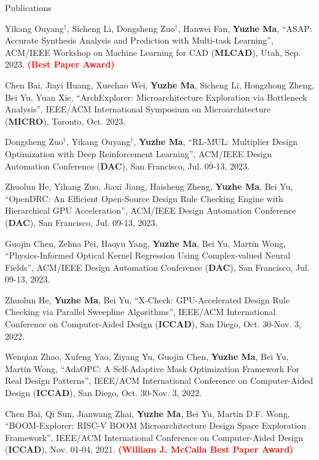 \begin{rSection}{Publications}
\begin{etaremune}
\item {
	Yikang Ouyang$^\dagger$, Sicheng Li, Dongsheng Zuo$^\dagger$, Hanwei Fan, \textbf{Yuzhe Ma},
	``ASAP: Accurate Synthesis Analysis and Prediction with Multi-task Learning'',
	ACM/IEEE Workshop on Machine Learning for CAD (\textbf{MLCAD}), Utah, Sep. 2023.
	\textcolor{red}{\textbf{(Best Paper Award)}}
}

\item {
    Chen Bai, Jiayi Huang, Xuechao Wei, \textbf{Yuzhe Ma}, Sicheng Li, Hongzhong Zheng, Bei Yu, Yuan Xie,
    ``ArchExplorer: Microarchitecture Exploration via Bottleneck Analysis'', 
    IEEE/ACM International Symposium on Microarchitecture (\textbf{MICRO}), Toronto, Oct. 2023.
}

\item {
    Dongsheng Zuo$^\dagger$, Yikang Ouyang$^\dagger$, \textbf{Yuzhe Ma},
    ``RL-MUL: Multiplier Design Optimization with Deep Reinforcement Learning'',
    ACM/IEEE Design Automation Conference (\textbf{DAC}), San Francisco, Jul. 09-13, 2023.
}

\item {
    Zhuolun He, Yihang Zuo, Jiaxi Jiang, Haisheng Zheng, \textbf{Yuzhe Ma}, Bei Yu,
    ``OpenDRC: An Efficient Open-Source Design Rule Checking Engine with Hierarchical GPU Acceleration'',
    ACM/IEEE Design Automation Conference (\textbf{DAC}), San Francisco, Jul. 09-13, 2023.
}

\item {
    Guojin Chen, Zehua Pei, Haoyu Yang, \textbf{Yuzhe Ma}, Bei Yu, Martin Wong,
    ``Physics-Informed Optical Kernel Regression Using Complex-valued Neural Fields'',
    ACM/IEEE Design Automation Conference (\textbf{DAC}), San Francisco, Jul. 09-13, 2023.
}

\item {
    Zhuolun He, \textbf{Yuzhe Ma}, Bei Yu,
    ``X-Check: GPU-Accelerated Design Rule Checking via Parallel Sweepline Algorithms'',
    IEEE/ACM International Conference on Computer-Aided Design (\textbf{ICCAD}), San Diego, Oct. 30-Nov. 3, 2022.
}

\item {
    Wenqian Zhao, Xufeng Yao, Ziyang Yu, Guojin Chen, \textbf{Yuzhe Ma}, Bei Yu, Martin Wong,
    ``AdaOPC: A Self-Adaptive Mask Optimization Framework For Real Design Patterns'',
    IEEE/ACM International Conference on Computer-Aided Design (\textbf{ICCAD}), San Diego, Oct. 30-Nov. 3, 2022.
}

\item {
    Chen Bai, Qi Sun, Jianwang Zhai, \textbf{Yuzhe Ma}, Bei Yu, Martin D.F. Wong,
    ``BOOM-Explorer: RISC-V BOOM Microarchitecture Design Space Exploration Framework'',
    IEEE/ACM International Conference on Computer-Aided Design (\textbf{ICCAD}), Nov. 01-04, 2021.
    \textcolor{red}{\textbf{(William J. McCalla Best Paper Award)}}
}



\end{etaremune}
\end{rSection}
